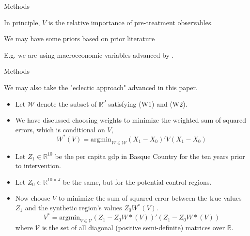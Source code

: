 \documentclass[notes,11pt, aspectratio=169]{beamer}
\newenvironment{wideitemize}{\itemize\addtolength{\itemsep}{10pt}}{\enditemize}
\begin{document}
\begin{frame}{Methods}
    \begin{wideitemize}
        \item In principle, $V$ is the relative importance of pre-treatment observables. 
        \item We may have some priors based on prior literature \medskip
        \begin{wideitemize}
            \item E.g. we are using macroeconomic variables advanced by \cite{barro_economic_2004}. 
        \end{wideitemize}
    \end{wideitemize}    
\end{frame}

\begin{frame}{Methods}
     
        We may also take the "eclectic approach" advanced in this paper. \pause 
    
    \begin{itemize}
    
            \item Let $\mathcal W$ denote the subset of $\mathbb R^J$ satisfying (W1) and (W2). \pause 
            
            \item We have discussed choosing weights to minimize the weighted sum of squared errors, which is conditional on $V$,
            \[ W^*(V) = \text{argmin}_{W \in \mathcal W} (X_1 - X_0)' V (X_1 - X_0) \] \pause 
            
            \item Let $Z_1 \in \mathbb R^{10}$ be the per capita gdp in Basque Country for the ten years prior to intervention. 
            
            \item Let $Z_0 \in \mathbb R^{10\times J}$ be the same, but for the potential control regions. \pause 
            
            \item Now choose $V$ to minimize the sum of squared error between the true values $Z_1$ and the synthetic region's values $Z_0 W^*(V)$. 
            \[ V^* = \text{argmin}_{V \in \mathcal V} (Z_1 - Z_0 W*(V) )' (Z_1 - Z_0 W*(V) ) \]
            where $\mathcal V$ is the set of all diagonal (positive semi-definite) matrices over $\mathbb R$. 
        
    \end{itemize}    
    
\end{frame}
\end{document}
